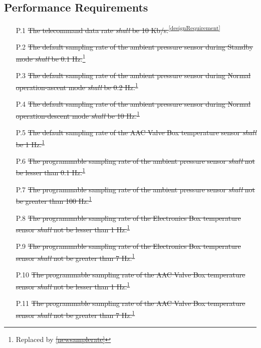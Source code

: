 \documentclass[a4paper,12pt,twoside]{article}
\providecommand{\DIFaddtex}[1]{{\protect\color{blue}\uwave{#1}}} %
\providecommand{\DIFdeltex}[1]{{\protect\color{red}\sout{#1}}}                      %
\providecommand{\DIFaddbegin}{} %
\providecommand{\DIFaddend}{} %
\providecommand{\DIFdelbegin}{} %
\providecommand{\DIFdelend}{} %
\providecommand{\DIFadd}[1]{\texorpdfstring{\DIFaddtex{#1}}{#1}} %
\providecommand{\DIFdel}[1]{\texorpdfstring{\DIFdeltex{#1}}{}} %
\newcommand{\DIFscaledelfig}{0.5}
\newlength{\DIFdelgraphicswidth} %
\newlength{\DIFdelgraphicsheight} %
\newcommand{\DIFaddincludegraphics}[2][]{{\color{blue}\fbox{\DIFOincludegraphics[#1]{#2}}}} %
\newcommand{\DIFdelincludegraphics}[2][]{%
\sbox{\DIFdelgraphicsbox}{\DIFOincludegraphics[#1]{#2}}%
\settoboxwidth{\DIFdelgraphicswidth}{\DIFdelgraphicsbox} %
\settoboxtotalheight{\DIFdelgraphicsheight}{\DIFdelgraphicsbox} %
\scalebox{\DIFscaledelfig}{%
\parbox[b]{\DIFdelgraphicswidth}{\usebox{\DIFdelgraphicsbox}\\[-\baselineskip] \rule{\DIFdelgraphicswidth}{0em}}\llap{\resizebox{\DIFdelgraphicswidth}{\DIFdelgraphicsheight}{%
\setlength{\unitlength}{\DIFdelgraphicswidth}%
\begin{picture}(1,1)%
\thicklines\linethickness{2pt} %
{\color[rgb]{1,0,0}\put(0,0){\framebox(1,1){}}}%
{\color[rgb]{1,0,0}\put(0,0){\line( 1,1){1}}}%
{\color[rgb]{1,0,0}\put(0,1){\line(1,-1){1}}}%
\end{picture}%
}\hspace*{3pt}}} %
} %
\DeclareRobustCommand{\DIFaddbegin}{\DIFOaddbegin \let\includegraphics\DIFaddincludegraphics} %
\DeclareRobustCommand{\DIFaddend}{\DIFOaddend \let\includegraphics\DIFOincludegraphics} %
\DeclareRobustCommand{\DIFdelbegin}{\DIFOdelbegin \let\includegraphics\DIFdelincludegraphics} %
\DeclareRobustCommand{\DIFdelend}{\DIFOaddend \let\includegraphics\DIFOincludegraphics} %
\begin{document}
\begin{appendices}
\subsection{Performance Requirements}

\begin{enumerate}
    \item[P.1] \st{The telecommand data rate \textit{shall} be 10 Kb/s.}\textsuperscript{\ref{designRequirement}}
    \item[P.2] \st{The default sampling rate of the ambient pressure sensor during Standby mode \textit{shall} be 0.1 Hz.}\footnote{Replaced by \DIFdelbegin \DIFdel{\ref{newsamplerate}}\DIFdelend \DIFaddbegin \DIFadd{P.23}\DIFaddend \label{replaceSampleRate}}
    \item[P.3] \st{The default sampling rate of the ambient pressure sensor during Normal operation-ascent mode \textit{shall} be 0.2 Hz.}\textsuperscript{\ref{replaceSampleRate}}
    \item[P.4] \st{The default sampling rate of the ambient pressure sensor during Normal operation-descent mode \textit{shall} be 10 Hz.}\textsuperscript{\ref{replaceSampleRate}}
    \item[P.5] \st{The default sampling rate of the AAC Valve Box temperature sensor \textit{shall} be 1 Hz.}\textsuperscript{\ref{replaceSampleRate}}
    \item[P.6] \st{The programmable sampling rate of the ambient pressure sensor \textit{shall} not be lesser than 0.1 Hz.}\textsuperscript{\ref{replaceSampleRate}}
    \item[P.7] \st{The programmable sampling rate of the ambient pressure sensor \textit{shall} not be greater than 100 Hz.}\textsuperscript{\ref{replaceSampleRate}}
    \item[P.8] \st{The programmable sampling rate of the Electronics Box temperature sensor \textit{shall} not be lesser than 1 Hz.}\textsuperscript{\ref{replaceSampleRate}}
    \item[P.9] \st{The programmable sampling rate of the Electronics Box temperature sensor \textit{shall} not be greater than 7 Hz.}\textsuperscript{\ref{replaceSampleRate}}
    \item[P.10] \st{The programmable sampling rate of the AAC Valve Box temperature sensor \textit{shall} not be lesser than 1 Hz.}\textsuperscript{\ref{replaceSampleRate}}
    \item[P.11] \st{The programmable sampling rate of the AAC Valve Box temperature sensor \textit{shall} not be greater than 7 Hz.}\textsuperscript{\ref{replaceSampleRate}}

\end{enumerate}
\end{appendices}
\end{document}
